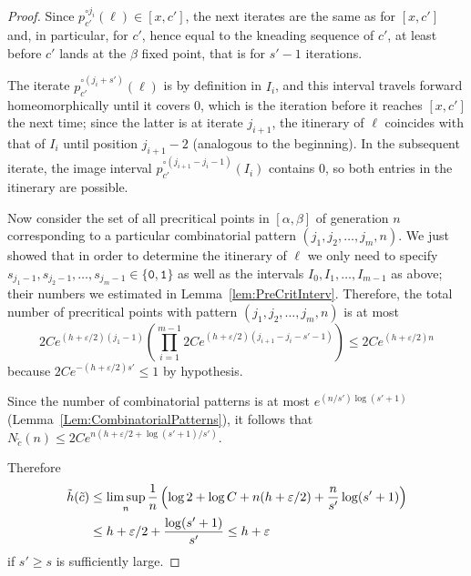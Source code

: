 \documentclass[12pt]{amsart}
\newcommand{\0}{\texttt{0}}
\newcommand{\1}{\texttt{1}}
\newcommand\eps{\varepsilon}
\theoremstyle{definition}
\numberwithin{equation}{section}
\begin{document}
\begin{proof}
Since $p_{c'}^{\circ j_i}(\ell)\in [x,c']$, the next iterates are the same as for $[x,c']$ and, in particular, for $c'$, hence equal to the kneading sequence of $c'$, at least before $c'$ lands at the $\beta$ fixed point, that is for $s'-1$ iterations. 

The iterate $p_{c'}^{\circ (j_i+s')}(\ell)$ is by definition in $I_i$, and this interval travels forward homeomorphically until it covers $0$, which is the iteration before it reaches $[x,c']$ the next time; since the latter is at iterate $j_{i+1}$, the itinerary of $\ell$ coincides with that of $I_i$ until position $j_{i+1}-2$ (analogous to the beginning). 
In the subsequent iterate, the image interval $p_{c'}^{\circ (j_{i+1}-j_i-1)}(I_i)$ contains $0$, so both entries in the itinerary are possible.



Now consider the set of all precritical points in $[\alpha,\beta]$ of generation $n$ corresponding to a particular combinatorial pattern $(j_1,j_2,\dots,j_m,n)$.
We just showed that in order to determine the itinerary of $\ell$ we only need to specify $s_{j_1-1},s_{j_2-1},\dots , s_{j_m-1}\in \{\0,\1\}$ as well as the intervals $I_0,I_1,\dots , I_{m-1}$ as above; their numbers we estimated {in Lemma~\ref{lem:PreCritInterv}}. Therefore, the total number of precritical points with pattern $(j_1,j_2,\dots,j_m,n)$ is at most 
\[
2 C e^{(h+\eps/2)(j_1-1)} \left(\prod_{i=1}^{m-1} 2C e^{(h+\eps/2)(j_{i+1}-j_i-s'-1)}\right)\le2C e^{(h+\eps/2)n}
\]
because $2Ce^{-(h+\eps/2)s'}\le 1$ by hypothesis.

Since the number of combinatorial patterns is at most $e^{(n/s')\log(s'+1)}$ (Lemma~\ref{Lem:CombinatorialPatterns}), it follows that $N_{\tilde c}(n) \le 2 C e^{n(h+\eps/2+\log(s'+1)/s')}$.


Therefore
\begin{align*}
\tilde h(\tilde c) 
&\le \limsup_n \frac{1}{n}\left(\log 2 +\log C + n (h+\eps/2)+\frac{n}{s'}\log(s'+1) \rule{0pt}{11pt} \right)  
\\
&\le h+\eps/2+ \frac{\log (s'+1)}{s'} \le h+\eps
\;
\end{align*}
if $s'\ge s$ is sufficiently large.  



\end{proof}
\end{document}
